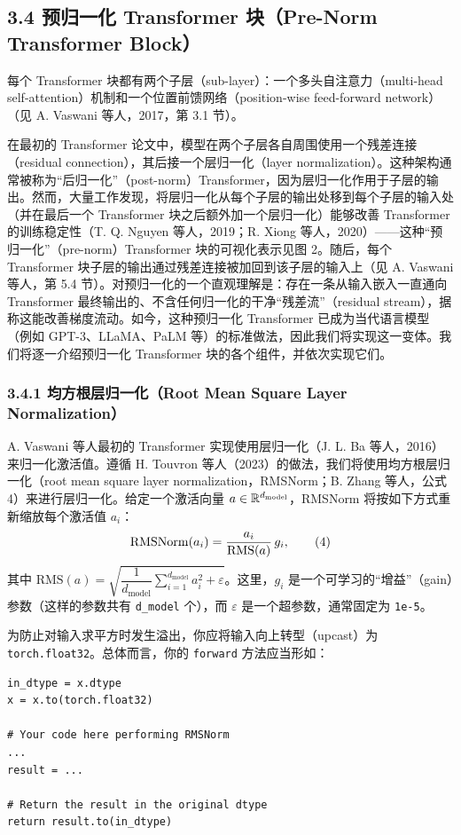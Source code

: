 \subsection*{3.4 预归一化 Transformer 块（Pre-Norm Transformer Block）}

每个 Transformer 块都有两个子层（sub-layer）：一个多头自注意力（multi-head self-attention）机制和一个位置前馈网络（position-wise feed-forward network）（见 A. Vaswani 等人，2017，第 3.1 节）。

在最初的 Transformer 论文中，模型在两个子层各自周围使用一个残差连接（residual connection），其后接一个层归一化（layer normalization）。这种架构通常被称为“后归一化”（post-norm）Transformer，因为层归一化作用于子层的输出。然而，大量工作发现，将层归一化从每个子层的输出处移到每个子层的输入处（并在最后一个 Transformer 块之后额外加一个层归一化）能够改善 Transformer 的训练稳定性（T. Q. Nguyen 等人，2019；R. Xiong 等人，2020）——这种“预归一化”（pre-norm）Transformer 块的可视化表示见图 2。随后，每个 Transformer 块子层的输出通过残差连接被加回到该子层的输入上（见 A. Vaswani 等人，第 5.4 节）。对预归一化的一个直观理解是：存在一条从输入嵌入一直通向 Transformer 最终输出的、不含任何归一化的干净“残差流”（residual stream），据称这能改善梯度流动。如今，这种预归一化 Transformer 已成为当代语言模型（例如 GPT-3、LLaMA、PaLM 等）的标准做法，因此我们将实现这一变体。我们将逐一介绍预归一化 Transformer 块的各个组件，并依次实现它们。


\subsubsection*{3.4.1 均方根层归一化（Root Mean Square Layer Normalization）}

A. Vaswani 等人最初的 Transformer 实现使用层归一化（J. L. Ba 等人，2016）来归一化激活值。遵循 H. Touvron 等人（2023）的做法，我们将使用均方根层归一化（root mean square layer normalization，RMSNorm；B. Zhang 等人，公式 4）来进行层归一化。给定一个激活向量 $a \in \mathbb{R}^{d_{\text{model}}}$，RMSNorm 将按如下方式重新缩放每个激活值 $a_i$：
\begin{equation*}
\operatorname{RMSNorm}(a_i) = \frac{a_i}{\mathrm{RMS}(a)}\, g_i, \tag{4}
\end{equation*}
其中 $\mathrm{RMS}(a) = \sqrt{\dfrac{1}{d_{\text{model}}} \displaystyle\sum_{i=1}^{d_{\text{model}}} a_i^2 + \varepsilon}$。这里，$g_i$ 是一个可学习的“增益”（gain）参数（这样的参数共有 \texttt{d\_model} 个），而 $\varepsilon$ 是一个超参数，通常固定为 \texttt{1e-5}。

为防止对输入求平方时发生溢出，你应将输入向上转型（upcast）为 \texttt{torch.float32}。总体而言，你的 \texttt{forward} 方法应当形如：
\begin{lstlisting}
in_dtype = x.dtype
x = x.to(torch.float32)

# Your code here performing RMSNorm
...
result = ...

# Return the result in the original dtype
return result.to(in_dtype)
\end{lstlisting}


